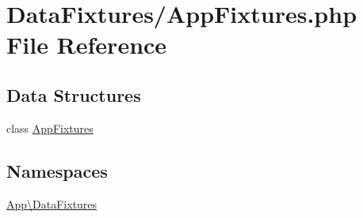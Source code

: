 \hypertarget{_app_fixtures_8php}{}\section{Data\+Fixtures/\+App\+Fixtures.php File Reference}
\label{_app_fixtures_8php}
\subsection*{Data Structures}
\begin{DoxyCompactItemize}
\item 
class \mbox{\hyperlink{class_app_1_1_data_fixtures_1_1_app_fixtures}{App\+Fixtures}}
\end{DoxyCompactItemize}
\subsection*{Namespaces}
\begin{DoxyCompactItemize}
\item 
 \mbox{\hyperlink{namespace_app_1_1_data_fixtures}{App\textbackslash{}\+Data\+Fixtures}}
\end{DoxyCompactItemize}
